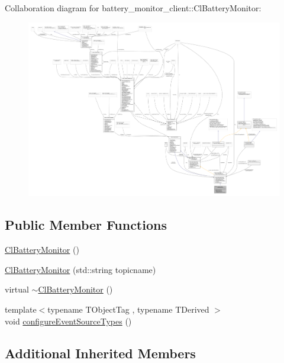Collaboration diagram for battery\+\_\+monitor\+\_\+client\+:\+:Cl\+Battery\+Monitor\+:
\nopagebreak
\begin{figure}[H]
\begin{center}
\leavevmode
\includegraphics[width=350pt]{classbattery__monitor__client_1_1ClBatteryMonitor__coll__graph}
\end{center}
\end{figure}
\subsection*{Public Member Functions}
\begin{DoxyCompactItemize}
\item 
\hyperlink{classbattery__monitor__client_1_1ClBatteryMonitor_a8788abf573a0d50bd24dbd3b0b752d0c}{Cl\+Battery\+Monitor} ()
\item 
\hyperlink{classbattery__monitor__client_1_1ClBatteryMonitor_ab09c854017369ba50938ce8cfbb54b40}{Cl\+Battery\+Monitor} (std\+::string topicname)
\item 
virtual \hyperlink{classbattery__monitor__client_1_1ClBatteryMonitor_a04bf9d943a21d6cb2433190d73d1422a}{$\sim$\+Cl\+Battery\+Monitor} ()
\item 
{\footnotesize template$<$typename T\+Object\+Tag , typename T\+Derived $>$ }\\void \hyperlink{classbattery__monitor__client_1_1ClBatteryMonitor_a8a9f26b32a60046d3ec8c5e92ac9b967}{configure\+Event\+Source\+Types} ()
\end{DoxyCompactItemize}
\subsection*{Additional Inherited Members}



